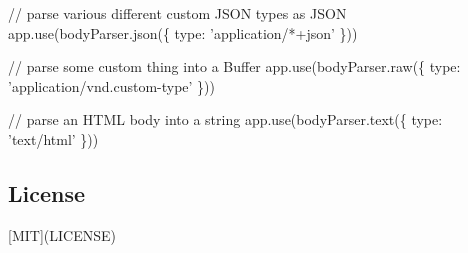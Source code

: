 \begin{DoxyCode}
\textcolor{comment}{// parse various different custom JSON types as JSON}
app.use(bodyParser.json(\{ type: \textcolor{stringliteral}{'application/*+json'} \}))

\textcolor{comment}{// parse some custom thing into a Buffer}
app.use(bodyParser.raw(\{ type: \textcolor{stringliteral}{'application/vnd.custom-type'} \}))

\textcolor{comment}{// parse an HTML body into a string}
app.use(bodyParser.text(\{ type: \textcolor{stringliteral}{'text/html'} \}))
\end{DoxyCode}


\subsection*{License}

\mbox{[}M\+I\+T\mbox{]}(L\+I\+C\+E\+N\+S\+E) 